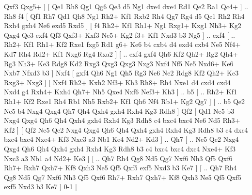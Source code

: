 Qxf3  Qxg5+   ]  [  Qe1 Rh8  Qg1 Qg6  Qe3 d5  Ng1 dxe4  dxe4 Rd1  Qe2 Ra1  Qc4+   ] .. Rh8    f4 [  Qf1 Rh7  Qd1 Qh8  Ng1 Rh2+  Kf1 Rxb2  Rh4 Qg7  Rg4 d5  Qc1 Rh2  Rh4 Rxh4  gxh4 Ne6  exd5 Rxd5   ]  [  f4 Rh2+  Kf1 Rh1+  Ng1 Rxg1+  Kxg1 Nh3+  Kg2 Qxg4  Qe3 exf4  Qf3 Qxf3+  Kxf3 Ne5+  Kg2 f3+  Kf1 Nxd3  b3 Ng5   ] .. exf4 [ .. Rh2+  Kf1 Rh1+  Kf2 Rxe1  fxg5 Rd1  g6+ Ke6  b4 cxb4  d4 exd4  cxb4 Ne5  Nf4+ Kd7  Rh4 Rd2+  Kf1 Nxg6  Rg4 Rxa2   ]  [ .. exf4  gxf4 Qh6  Kf2 Qh2+  Rg2 Qh4+  Rg3 Nh3+  Ke3 Rdg8  Kd2 Rxg3  Qxg3 Qxg3  Nxg3 Nxf4  Nf5 Ne5  Nxd6+ Ke6  Nxb7 Nfxd3  b3   ]  Nxf4 [  gxf4 Qh6  Ng1 Qh5  Rg3 Ne6  Ne2 Rdg8  Kf2 Qh2+  Ke3 Rxg3+  Nxg3   ]  [  Nxf4 Rh2+  Kxh2 Nf3+  Kh3 Rh8+  Rh4 Nxe1  d4 cxd4  cxd4 Nxd4  g4 Rxh4+  Kxh4 Qh7+  Nh5 Qxe4  Nxf6 Nef3+  Kh3   ] .. b5 [ .. Rh2+  Kf1 Rh1+  Kf2 Rxe1  Rh4 Rb1  Nh5 Rxb2+  Kf1 Qh6  Nf4 Rb1+  Kg2 Qg7   ]  [ .. b5  Qe2 Ne5  b4 Nxg4  Qxg4 Qh7  Qh4 Qxh4  gxh4 Rxh4  Kg3 Rdh8   ]  Qf2 [  Qd1 Ne5  b3 Nxg4  Qxg4 Qh6  Qh4 Qxh4  gxh4 Rxh4  Kg3 Rdh8  c4 bxc4  bxc4 Ne6  Nd5 Rh3+  Kf2   ]  [  Qf2 Ne5  Qe2 Nxg4  Qxg4 Qh6  Qh4 Qxh4  gxh4 Rxh4  Kg3 Rdh8  b3 c4  dxc4 bxc4  bxc4 Nxe4+  Kf3 Nxc3  a3 Nb1  Ke4 Nd2+  Kd3   ] .. Qh7 [ .. Ne5  Qe2 Nxg4  Qxg4 Qh6  Qh4 Qxh4  gxh4 Rxh4  Kg3 Rdh8  b3 c4  bxc4 bxc4  dxc4 Nxe4+  Kf3 Nxc3  a3 Nb1  a4 Nd2+  Ke3   ]  [ .. Qh7  Rh4 Qg8  Nd5 Qg7  Nxf6 Nh3  Qf5 Qxf6  Rh7+ Rxh7  Qxh7+ Kf8  Qxh3 Ne5  Qf5 Qxf5  exf5 Nxd3  b3 Ke7   ]  [ .. Qh7  Rh4 Qg8  Nd5 Qg7  Nxf6 Nh3  Qf5 Qxf6  Rh7+ Rxh7  Qxh7+ Kf8  Qxh3 Ne5  Qf5 Qxf5  exf5 Nxd3  b3 Ke7   ] 0-1  |
